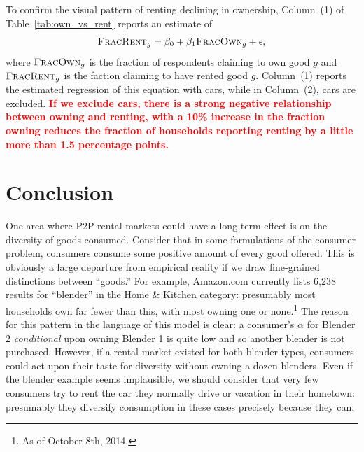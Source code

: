 \documentclass[11pt]{article}
\newcommand{\important}[1]{\textcolor{red}{\textbf{#1}}}
\newcommand{\important}[1]{#1}
\begin{document}


To confirm the visual pattern of renting declining in ownership, Column~(1) of Table~\ref{tab:own_vs_rent} reports an estimate of 
\begin{align}
\textsc{FracRent}_g = \beta_0 + \beta_1 \textsc{FracOwn}_g + \epsilon,  
\end{align} 
where $\textsc{FracOwn}_g$ is the fraction of respondents claiming to own good $g$ and $\textsc{FracRent}_g$ is the faction claiming to have rented good $g$.
Column~(1) reports the estimated regression of this equation with cars, while in Column~(2), cars are excluded.
\important{If we exclude cars, there is a strong negative relationship between owning and renting, with a 10\% increase in the fraction owning reduces the fraction of households reporting renting by a little more than 1.5 percentage points. }

\section{Conclusion} 

One area where P2P rental markets could have a long-term effect is on the diversity of goods consumed. 
Consider that in some formulations of the consumer problem, consumers consume some positive amount of every good offered.
This is obviously a large departure from empirical reality if we draw fine-grained distinctions between ``goods.'' 
For example, Amazon.com currently lists 6,238 results for ``blender'' in the Home \& Kitchen category: 
presumably most households own far fewer than this, with most owning one or none.\footnote{As of October 8th, 2014.}
The reason for this pattern in the language of this model is clear: 
a consumer's $\alpha$ for Blender 2 \emph{conditional} upon owning Blender 1 is quite low and so another blender is not purchased.
However, if a rental market existed for both blender types, consumers could act upon their taste for diversity without owning a dozen blenders. 
Even if the blender example seems implausible, we should consider that very few consumers try to rent the car they normally drive or vacation in their hometown: presumably they diversify consumption in these cases precisely because they can. 
\end{document}
